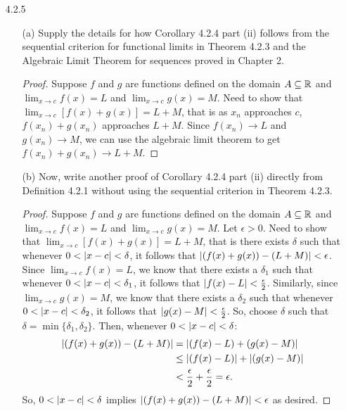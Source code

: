 \documentclass[12pt,letterpaper]{article}
\begin{document}
\begin{itemize}[leftmargin=!,labelindent=5pt]
\begin{itemize}
            \end{itemize}
        \item [4.2.5] 
            \begin{itemize}
                \item [(a)] Supply the details for how Corollary 4.2.4 part (ii) follows from the sequential criterion for functional limits in Theorem 4.2.3 and the Algebraic Limit Theorem for sequences proved in Chapter 2.
                    \begin{proof}
                        Suppose $f$ and $g$ are functions defined on the domain $A \subseteq \mathbb{R}$ and $\lim_{x \to c} f(x) = L$ and $\lim_{x \to c} g(x) = M$.
                        Need to show that $\lim_{x \to c} [f(x) + g(x)] = L + M$, that is as $x_n$ approaches $c$, $f(x_n) + g(x_n)$ approaches $L + M$.
                        Since $f(x_n) \to L$ and $g(x_n) \to M$, we can use the algebraic limit theorem to get $f(x_n) + g(x_n) \to L + M$.

                    \end{proof}
                \item [(b)] Now, write another proof of Corollary 4.2.4 part (ii) directly from Definition 4.2.1 without using the sequential criterion in Theorem 4.2.3.
                    \begin{proof}
                        Suppose $f$ and $g$ are functions defined on the domain $A \subseteq \mathbb{R}$ and $\lim_{x \to c} f(x) = L$ and $\lim_{x \to c} g(x) = M$.
                        Let $\epsilon > 0$.
                        Need to show that $\lim_{x \to c} [f(x) + g(x)] = L + M$, that is there exists $\delta$ such that whenever $0 < \abs{x-c} < \delta$, it follows that $\abs{(f(x) + g(x)) - (L + M)} < \epsilon$.
                        Since $\lim_{x \to c} f(x) = L$, we know that there exists a $\delta_1$ such that whenever $0 < \abs{x-c} < \delta_1$, it follows that $\abs{f(x) - L} < \frac{\epsilon}{2}$.
                        Similarly, since $\lim_{x \to c} g(x) = M$, we know that there exists a $\delta_2$ such that whenever $0 < \abs{x-c} < \delta_2$, it follows that $\abs{g(x) - M} < \frac{\epsilon}{2}$.
                        So, choose $\delta$ such that $\delta = \min\{\delta_1, \delta_2\}$.
                        Then, whenever $0 < \abs{x-c} < \delta$:
                        \begin{align*}
                            \abs{(f(x) + g(x)) - (L + M)} &= \abs{(f(x) - L) + (g(x) - M)} \\
                            &\leq \abs{(f(x) - L)} + \abs{(g(x) - M)}\\
                            &< \frac{\epsilon}{2} + \frac{\epsilon}{2} = \epsilon.
                        \end{align*}
                        So, $0 < \abs{x-c} < \delta$ implies $\abs{(f(x) + g(x)) - (L + M)} < \epsilon$ as desired.
                    \end{proof}


\end{itemize}
\end{itemize}
\end{document}
